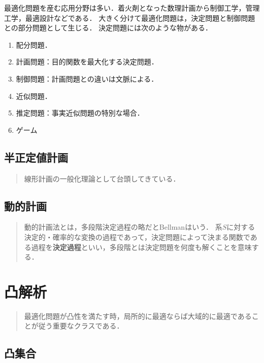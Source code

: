 \documentclass[uplatex,dvipdfmx]{jsreport}
\begin{document}
\begin{application}
    最適化問題を産む応用分野は多い．着火剤となった数理計画から制御工学，管理工学，最適設計などである．
    大きく分けて最適化問題は，決定問題と制御問題との部分問題として生じる．
    決定問題には次のような物がある．
    \begin{enumerate}
        \item 配分問題．
        \item 計画問題：目的関数を最大化する決定問題．
        \item 制御問題：計画問題との違いは文脈による．
        \item 近似問題．
        \item 推定問題：事実近似問題の特別な場合．
        \item ゲーム
    \end{enumerate}
\end{application}

\section{半正定値計画}

\begin{quotation}
    線形計画の一般化理論として台頭してきている．
\end{quotation}

\section{動的計画}

\begin{quotation}
    動的計画法とは，多段階決定過程の略だとBellmanはいう\cite{Bellman-DP}．
    系$S$に対する決定的・確率的な変換の過程であって，決定問題によって決まる関数である過程を\textbf{決定過程}といい，多段階とは決定問題を何度も解くことを意味する．
\end{quotation}

\chapter{凸解析}

\begin{quotation}
    最適化問題が凸性を満たす時，局所的に最適ならば大域的に最適であることが従う重要なクラスである．
\end{quotation}

\section{凸集合}
\end{document}
